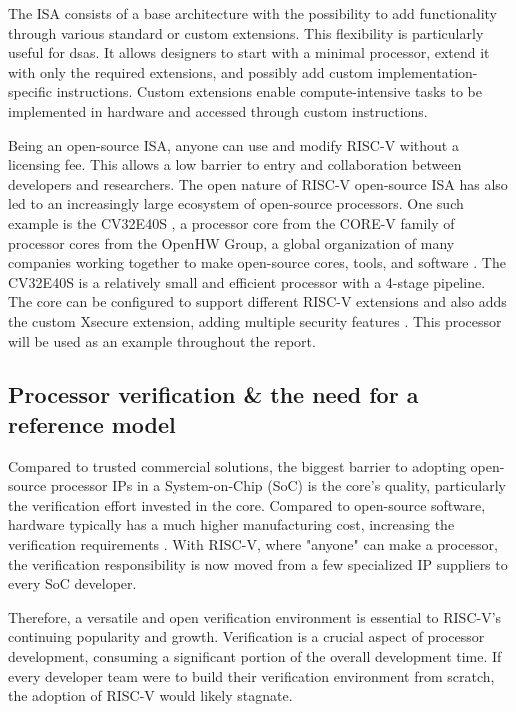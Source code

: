 The ISA consists of a base architecture with the possibility to add functionality through various standard or custom extensions\cite{watermanRISCVInstructionSet2019}. This flexibility is particularly useful for \acrshort{dsa}s. It allows designers to start with a minimal processor, extend it with only the required extensions, and possibly add custom implementation-specific instructions. Custom extensions enable compute-intensive tasks to be implemented in hardware and accessed through custom instructions. 

Being an open-source ISA, anyone can use and modify RISC-V without a licensing fee. This allows a low barrier to entry and collaboration between developers and researchers. The open nature of RISC-V open-source ISA has also led to an increasingly large ecosystem of open-source processors. One such example is the CV32E40S \cite{openhwgroupCv32e40s2024}, a processor core from the CORE-V family of processor cores from the OpenHW Group, a global organization of many companies working together to make open-source cores, tools, and software \cite{taylorAdvancedRISCVVerification2023}. The CV32E40S is a relatively small and efficient processor with a 4-stage pipeline. The core can be configured to support different RISC-V extensions and also adds the custom Xsecure extension, adding multiple security features \cite{openhwgroupIntroductionCOREVCV32E40S2023}. This processor will be used as an example throughout the report.





\subsection{Processor verification \& the need for a reference model}

Compared to trusted commercial solutions, the biggest barrier to adopting open-source processor IPs in a System-on-Chip (SoC) is the core's quality, particularly the verification effort invested in the core. Compared to open-source software, hardware typically has a much higher manufacturing cost, increasing the verification requirements \cite{kevinmcdermottOpenHWIndustrialGradeVerification2022}.
With RISC-V, where "anyone" can make a processor, the verification responsibility is now moved from a few specialized IP suppliers to every SoC developer. 

Therefore, a versatile and open verification environment is essential to RISC-V's continuing popularity and growth. Verification is a crucial aspect of processor development, consuming a significant portion of the overall development time. If every developer team were to build their verification environment from scratch, the adoption of RISC-V would likely stagnate.

